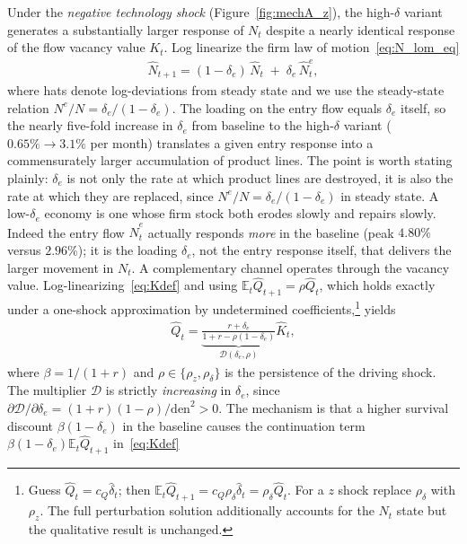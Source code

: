 \documentclass[authoryear, review, 12pt]{elsarticle}
\begin{document}
	Under the \emph{negative technology shock} (Figure~\ref{fig:mechA_z}),
	the high-$\delta$ variant generates a substantially larger
	response of $N_t$ despite a nearly identical response of the flow vacancy value $K_t$. Log linearize the firm law of
	motion~\eqref{eq:N_lom_eq}
	\begin{align}\label{eq:N_lom_ll}
		\hat{N}_{t+1}
		= (1-\delta_e)\,\hat{N}_t \;+\; \delta_e\,\hat{N}_t^e,
	\end{align}
	where hats denote log-deviations from steady state and we use
	the steady-state relation $N^e/N=\delta_e/(1-\delta_e)$.
	The loading on the entry flow equals $\delta_e$ itself, so the
	nearly five-fold increase in $\delta_e$ from baseline to the
	high-$\delta$ variant ($0.65\%\to3.1\%$ per month) translates a given
	entry response into a commensurately larger accumulation of product
	lines.  The point is worth stating plainly: $\delta_e$ is not only the
	rate at which product lines are destroyed, it is also the rate at which
	they are replaced, since $N^e/N=\delta_e/(1-\delta_e)$ in steady state.
	A low-$\delta_e$ economy is one whose firm stock both erodes slowly and
	repairs slowly.  Indeed the entry flow $\hat{N}^e_t$ actually responds
	\emph{more} in the baseline (peak $4.80\%$ versus $2.96\%$); it is the
	loading $\delta_e$, not the entry response itself, that delivers the
	larger movement in $N_t$.
	A complementary channel operates through the vacancy
	value. Log-linearizing~\eqref{eq:Kdef} and using $\mathbb{E}_t\hat{Q}_{t+1}=\rho\hat{Q}_t$,
	which holds exactly under a one-shock approximation by undetermined
	coefficients,\footnote{Guess $\hat{Q}_t=c_Q\hat{\delta}_t$; then
	$\mathbb{E}_t\hat{Q}_{t+1}=c_Q\rho_\delta\hat{\delta}_t=\rho_\delta\hat{Q}_t$.
	For a $z$ shock replace $\rho_\delta$ with $\rho_z$.  The full
	perturbation solution additionally accounts for the $N_t$ state but
	the qualitative result is unchanged.}
	yields
	\begin{align}\label{eq:Q_ll}
		\hat{Q}_t
		= \underbrace{\frac{r+\delta_e}{1+r-\rho(1-\delta_e)}}_{\displaystyle\mathcal{D}(\delta_e,\rho)}
		\hat{K}_t,
	\end{align}
	where $\beta=1/(1+r)$ and $\rho\in\{\rho_z,\rho_\delta\}$ is the
	persistence of the driving shock.  The multiplier $\mathcal{D}$
	is strictly \emph{increasing} in $\delta_e$, since
	$\partial\mathcal{D}/\partial\delta_e=(1+r)(1-\rho)/\mathrm{den}^2>0$.
	The mechanism is that a higher survival discount $\beta(1-\delta_e)$
	in the baseline causes the continuation term
	$\beta(1-\delta_e)\mathbb{E}_t\hat{Q}_{t+1}$ in~\eqref{eq:Kdef}
\end{document}
